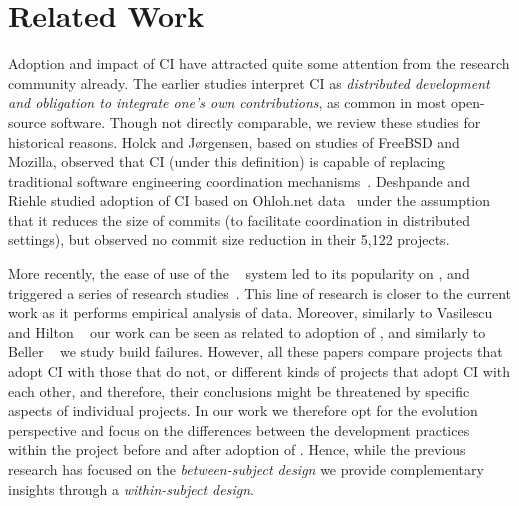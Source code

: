 
\section{Related Work}
\label{sec:rw}

Adoption and impact of CI have attracted quite some attention from the research 
community already. 
The earlier studies interpret CI as \emph{distributed development and obligation 
to integrate one's own contributions}, as common in most open-source software.
Though not directly comparable, we review these studies for historical reasons.
Holck and J{\o}rgensen, based on studies of FreeBSD and Mozilla, observed that 
CI (under this definition) is capable of replacing traditional software engineering 
coordination mechanisms~\cite{HolckJ03}.  
Deshpande and Riehle studied adoption of CI based on Ohloh.net data~\cite{Deshpande2008}
under the assumption that it reduces the size of commits (to facilitate coordination
in distributed settings), but observed no commit size reduction in their 5,122 projects. 

More recently, the ease of use of the \Tvis~\cite{TravisCI} system led to its 
popularity on \GH, and triggered a series of research studies~\cite{era14, 
VasilescuYWDF15, yue2015wait, BellerGZ16, Hilton2016, Yu2016}.
This line of research is closer to the current work as it performs empirical
analysis of \Tvis data. Moreover, similarly to Vasilescu \etal~\cite{era14}
and Hilton \etal~\cite{Hilton2016} our work can be seen as related to adoption of \Tvis,
and similarly to Beller \etal~\cite{BellerGZ16} we study build failures.
However, all these papers compare projects that adopt CI with those that do not, 
or different kinds of projects that adopt CI with each other, and therefore, their
conclusions might be threatened by specific aspects of individual projects.
In our work we therefore opt for the evolution perspective and focus on the
differences between the development practices within the project before and
after adoption of \Tvis.
Hence, while the previous research has focused on the \emph{between-subject 
design} we provide complementary insights through a \emph{within-subject design}.

